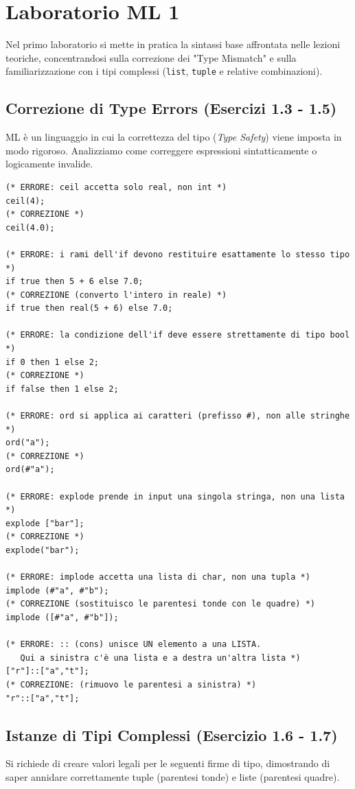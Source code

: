 \documentclass[12pt, a4paper]{article}
\begin{document}
\section{Laboratorio ML 1}

Nel primo laboratorio si mette in pratica la sintassi base affrontata nelle lezioni teoriche, concentrandosi sulla correzione dei "Type Mismatch" e sulla familiarizzazione con i tipi complessi (\texttt{list}, \texttt{tuple} e relative combinazioni).

\subsection{Correzione di Type Errors (Esercizi 1.3 - 1.5)}
ML è un linguaggio in cui la correttezza del tipo (\textit{Type Safety}) viene imposta in modo rigoroso. Analizziamo come correggere espressioni sintatticamente o logicamente invalide.

\newpage

\begin{verbatim}
(* ERRORE: ceil accetta solo real, non int *)
ceil(4); 
(* CORREZIONE *)
ceil(4.0);

(* ERRORE: i rami dell'if devono restituire esattamente lo stesso tipo *)
if true then 5 + 6 else 7.0; 
(* CORREZIONE (converto l'intero in reale) *)
if true then real(5 + 6) else 7.0;

(* ERRORE: la condizione dell'if deve essere strettamente di tipo bool *)
if 0 then 1 else 2; 
(* CORREZIONE *)
if false then 1 else 2;

(* ERRORE: ord si applica ai caratteri (prefisso #), non alle stringhe *)
ord("a"); 
(* CORREZIONE *)
ord(#"a");

(* ERRORE: explode prende in input una singola stringa, non una lista *)
explode ["bar"]; 
(* CORREZIONE *)
explode("bar");

(* ERRORE: implode accetta una lista di char, non una tupla *)
implode (#"a", #"b"); 
(* CORREZIONE (sostituisco le parentesi tonde con le quadre) *)
implode ([#"a", #"b"]);

(* ERRORE: :: (cons) unisce UN elemento a una LISTA. 
   Qui a sinistra c'è una lista e a destra un'altra lista *)
["r"]::["a","t"]; 
(* CORREZIONE: (rimuovo le parentesi a sinistra) *)
"r"::["a","t"];
\end{verbatim}

\newpage

\subsection{Istanze di Tipi Complessi (Esercizio 1.6 - 1.7)}
Si richiede di creare valori legali per le seguenti firme di tipo, dimostrando di saper annidare correttamente tuple (parentesi tonde) e liste (parentesi quadre).
\end{document}

